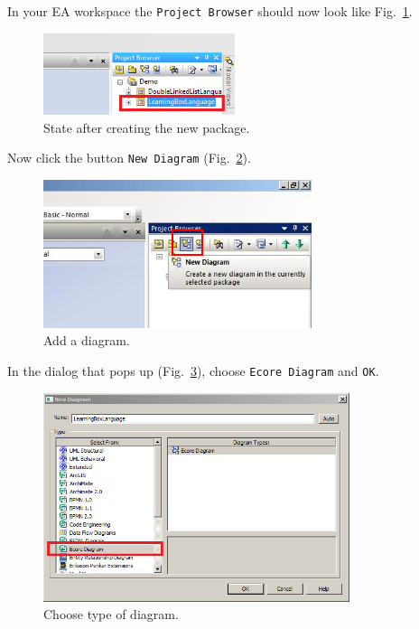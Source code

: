 In your EA workspace the \texttt{Project Browser} should now look like
Fig.~\ref{fig:new_package_completed}.

\begin{figure}[htbp]
	\centering
  \includegraphics[width=0.5\textwidth]{pics/memBoxBilder/memBox03.png}
	\caption{State after creating the new package.}
	\label{fig:new_package_completed}
\end{figure}

Now click the button \texttt{New Diagram} (Fig.~\ref{fig:diagram}).

\begin{figure}[htbp]
	\centering
  \includegraphics[width=0.7\textwidth]{pics/memBoxBilder/memBox04.png}
	\caption{Add a diagram.}
	\label{fig:diagram}
\end{figure}

In the dialog that pops up (Fig.~\ref{fig:diagram_type}), choose \texttt{Ecore
Diagram} and  \texttt{OK}. 


\begin{figure}[htbp]
	\centering
  \includegraphics[width=0.8\textwidth]{pics/memBoxBilder/memBox05.png}
	\caption{Choose type of diagram.}
	\label{fig:diagram_type}
\end{figure}

